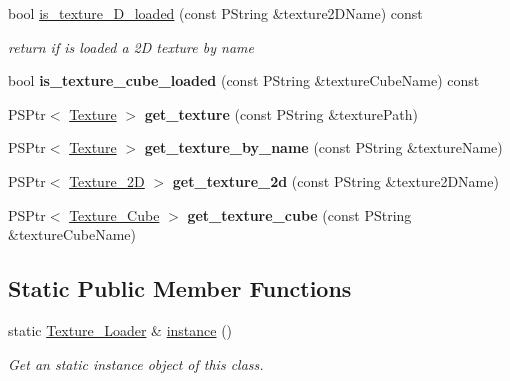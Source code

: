 \begin{DoxyCompactItemize}
bool \mbox{\hyperlink{classprz_1_1_texture___loader_ac57a1e14179f8aff43030b2c5f85ca59}{is\+\_\+texture\+\_\+D\+\_\+loaded}} (const P\+String \&texture2\+D\+Name) const
\begin{DoxyCompactList}\small\item\em return if is loaded a 2D texture by name \end{DoxyCompactList}\item 
\mbox{\label{classprz_1_1_texture___loader_a2f2a029a3688a1360ad234becd8f4304}} 
bool {\bfseries is\+\_\+texture\+\_\+cube\+\_\+loaded} (const P\+String \&texture\+Cube\+Name) const
\item 
\mbox{\label{classprz_1_1_texture___loader_a67365b6e0f0990c227c7bdcc2d59c666}} 
P\+S\+Ptr$<$ \mbox{\hyperlink{classprz_1_1_texture}{Texture}} $>$ {\bfseries get\+\_\+texture} (const P\+String \&texture\+Path)
\item 
\mbox{\label{classprz_1_1_texture___loader_a387d220d817d09c19efa7cfc839fae4b}} 
P\+S\+Ptr$<$ \mbox{\hyperlink{classprz_1_1_texture}{Texture}} $>$ {\bfseries get\+\_\+texture\+\_\+by\+\_\+name} (const P\+String \&texture\+Name)
\item 
\mbox{\label{classprz_1_1_texture___loader_a72244f8b959048f4c2fe3e498922871c}} 
P\+S\+Ptr$<$ \mbox{\hyperlink{classprz_1_1_texture__2_d}{Texture\+\_\+2D}} $>$ {\bfseries get\+\_\+texture\+\_\+2d} (const P\+String \&texture2\+D\+Name)
\item 
\mbox{\label{classprz_1_1_texture___loader_a2863ad70bf3d96a2cb107eb957a6e605}} 
P\+S\+Ptr$<$ \mbox{\hyperlink{classprz_1_1_texture___cube}{Texture\+\_\+\+Cube}} $>$ {\bfseries get\+\_\+texture\+\_\+cube} (const P\+String \&texture\+Cube\+Name)
\end{DoxyCompactItemize}
\subsection*{Static Public Member Functions}
\begin{DoxyCompactItemize}
\item 
static \mbox{\hyperlink{classprz_1_1_texture___loader}{Texture\+\_\+\+Loader}} \& \mbox{\hyperlink{classprz_1_1_texture___loader_ad4ec3289aad70624cf0ae28048e84778}{instance}} ()
\begin{DoxyCompactList}\small\item\em Get an static instance object of this class. \end{DoxyCompactList}\end{DoxyCompactItemize}


